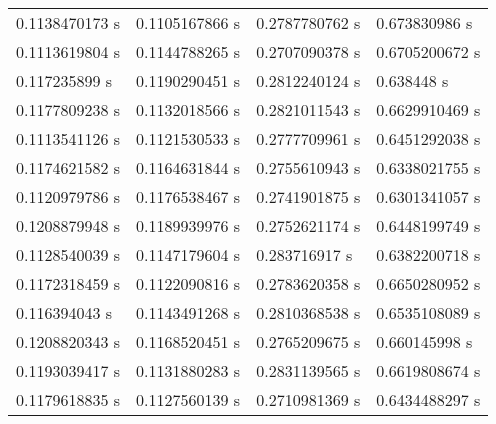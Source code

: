 \begin{table}[]
\begin{tabular}{llll}
    0.1138470173 s & 0.1105167866 s & 0.2787780762 s & 0.673830986 s  \\
    0.1113619804 s & 0.1144788265 s & 0.2707090378 s & 0.6705200672 s \\
    0.117235899 s  & 0.1190290451 s & 0.2812240124 s & 0.638448 s     \\
    0.1177809238 s & 0.1132018566 s & 0.2821011543 s & 0.6629910469 s \\
    0.1113541126 s & 0.1121530533 s & 0.2777709961 s & 0.6451292038 s \\
    0.1174621582 s & 0.1164631844 s & 0.2755610943 s & 0.6338021755 s \\
    0.1120979786 s & 0.1176538467 s & 0.2741901875 s & 0.6301341057 s \\
    0.1208879948 s & 0.1189939976 s & 0.2752621174 s & 0.6448199749 s \\
    0.1128540039 s & 0.1147179604 s & 0.283716917 s  & 0.6382200718 s \\
    0.1172318459 s & 0.1122090816 s & 0.2783620358 s & 0.6650280952 s \\
    0.116394043 s  & 0.1143491268 s & 0.2810368538 s & 0.6535108089 s \\
    0.1208820343 s & 0.1168520451 s & 0.2765209675 s & 0.660145998 s  \\
    0.1193039417 s & 0.1131880283 s & 0.2831139565 s & 0.6619808674 s \\
    0.1179618835 s & 0.1127560139 s & 0.2710981369 s & 0.6434488297 s
  \end{tabular}
\end{table}

